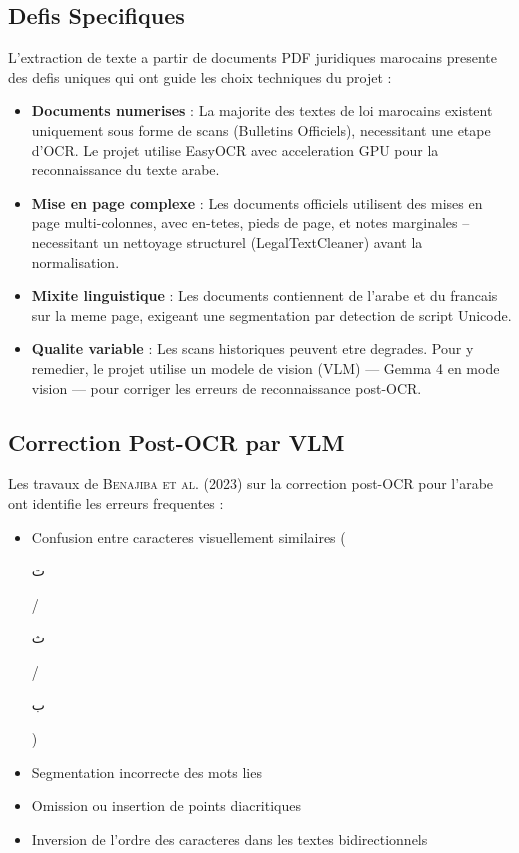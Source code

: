 \subsection{Defis Specifiques}

L'extraction de texte a partir de documents PDF juridiques marocains presente des defis uniques qui ont guide les choix techniques du projet :

\begin{itemize}
    \item \textbf{Documents numerises} : La majorite des textes de loi marocains existent uniquement sous forme de scans (Bulletins Officiels), necessitant une etape d'OCR. Le projet utilise EasyOCR avec acceleration GPU pour la reconnaissance du texte arabe.
    
    \item \textbf{Mise en page complexe} : Les documents officiels utilisent des mises en page multi-colonnes, avec en-tetes, pieds de page, et notes marginales -- necessitant un nettoyage structurel (LegalTextCleaner) avant la normalisation.
    
    \item \textbf{Mixite linguistique} : Les documents contiennent de l'arabe et du francais sur la meme page, exigeant une segmentation par detection de script Unicode.
    
    \item \textbf{Qualite variable} : Les scans historiques peuvent etre degrades. Pour y remedier, le projet utilise un modele de vision (VLM) --- Gemma 4 en mode vision --- pour corriger les erreurs de reconnaissance post-OCR.
\end{itemize}

\subsection{Correction Post-OCR par VLM}

Les travaux de \textsc{Benajiba et al.} (2023) sur la correction post-OCR pour l'arabe ont identifie les erreurs frequentes :

\begin{itemize}
    \item Confusion entre caracteres visuellement similaires (\begin{otherlanguage}{arabic}ت\end{otherlanguage} / \begin{otherlanguage}{arabic}ث\end{otherlanguage} / \begin{otherlanguage}{arabic}ب\end{otherlanguage})
    \item Segmentation incorrecte des mots lies
    \item Omission ou insertion de points diacritiques
    \item Inversion de l'ordre des caracteres dans les textes bidirectionnels
\end{itemize}


